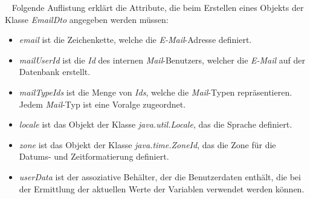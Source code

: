\ \newline
Folgende Auflistung erklärt die Attribute, die beim Erstellen eines Objekts der Klasse \emph{EmailDto} angegeben werden müssen:
\begin{itemize}
	\item\emph{email}
	\newline
	ist die Zeichenkette, welche die \emph{E-Mail}-Adresse definiert.
	\item\emph{mailUserId}
	\newline
	ist die \emph{Id} des internen \emph{Mail}-Benutzers, welcher die \emph{E-Mail} auf der Datenbank erstellt.
	\item\emph{mailTypeIds}
	\newline
	ist die Menge von \emph{Ids}, welche die \emph{Mail}-Typen repräsentieren. Jedem \emph{Mail}-Typ ist eine Voralge zugeordnet.
	\item\emph{locale}
	\newline
	ist das Objekt der Klasse \emph{java.util.Locale}, das die Sprache definiert.
	\item\emph{zone} 
	\newline
	ist das Objekt der Klasse \emph{java.time.ZoneId}, das die Zone für die Datums- und Zeitformatierung definiert.
	\item\emph{userData} 
	\newline
	ist der assoziative Behälter, der die Benutzerdaten enthält, die bei der Ermittlung der aktuellen Werte der Variablen verwendet werden können.
\end{itemize}